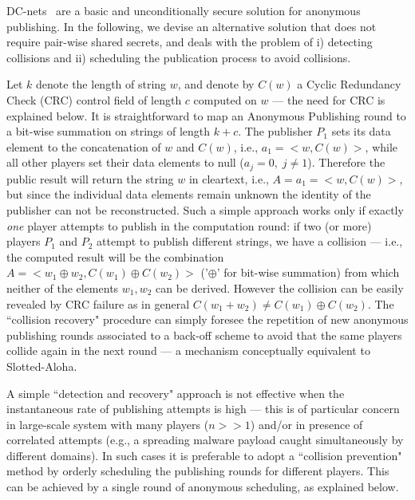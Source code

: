 \documentclass{sig-alternate}
\begin{document}
DC-nets~\cite{chaum1988dining} are a basic and unconditionally secure solution for anonymous publishing. In the following, we devise an alternative solution that does not require pair-wise shared secrets, 
 and deals with the problem of i) detecting collisions and ii) scheduling the publication process to avoid collisions. 

Let $k$ denote the length of string $w$, and denote by $C(w)$ a Cyclic Redundancy Check (CRC) control field of length $c$ computed on $w$ --- the need for CRC is explained below.
It is straightforward to map an Anonymous Publishing round to a bit-wise summation on strings of length $k+c$.
The publisher $P_1$ sets its data element to the concatenation of $w$ and $C(w)$, i.e., $a_1=<w,C(w)>$, while all other players
set their data elements to null ($a_j=0, \; j \neq 1$).
Therefore the public result will return the string $w$ in cleartext, i.e., $A=a_1=<w,C(w)>$, but since the individual data elements remain unknown the identity of the publisher can not be reconstructed.
Such a simple approach works only if exactly {\em one} player attempts to publish in the computation round: if two (or more) players $P_1$ and $P_2$ attempt to publish different strings, we have a collision --- i.e., the computed result will be the combination $A=<w_1\oplus w_2, C(w_1) \oplus C(w_2)>$ ('$\oplus$' for bit-wise summation) from which neither of the elements $w_1,w_2$ can be derived. However the collision can be easily revealed by CRC failure as in general $C(w_1+w_2) \neq  C(w_1) \oplus C(w_2)$.
The ``collision recovery" procedure can simply foresee the repetition of new anonymous publishing rounds associated to a back-off scheme to avoid that the same players collide again in the next round --- a mechanism conceptually equivalent to Slotted-Aloha.


A simple ``detection and recovery" approach is not effective when   
the instantaneous rate of publishing attempts is high --- this is of particular concern in large-scale system with many players ($n>>1$) and/or in presence of correlated attempts (e.g., a spreading malware payload caught simultaneously by different domains).   
In such cases it is preferable to adopt a ``collision prevention" method by 
orderly scheduling the publishing rounds for different players.
This can be achieved by a single round of anonymous scheduling, as explained below. 
\end{document}
